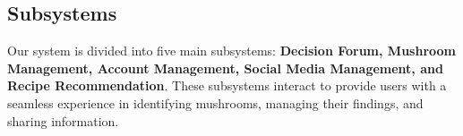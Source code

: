 \documentclass[]{article}
\begin{document}




\subsection{Subsystems}
Our system is divided into five main subsystems: \textbf{Decision Forum, Mushroom Management, Account Management, Social Media Management, and Recipe Recommendation}. These subsystems interact to provide users with a seamless experience in identifying mushrooms, managing their findings, and sharing information.
\end{document}
